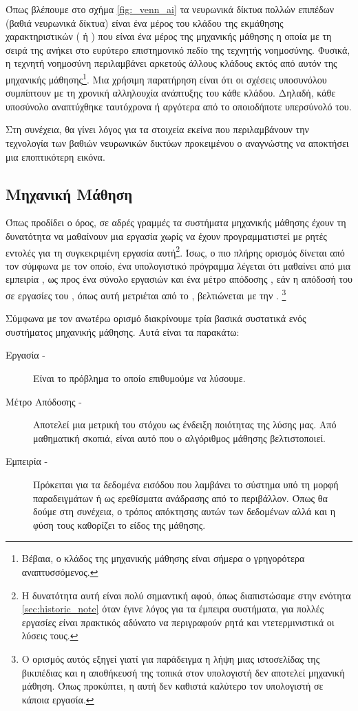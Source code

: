 Όπως βλέπουμε στο σχήμα \ref{fig:_venn_ai} τα νευρωνικά δίκτυα πολλών επιπέδων (βαθιά νευρωνικά δίκτυα) είναι ένα μέρος του κλάδου της εκμάθησης χαρακτηριστικών ( ή ) που είναι ένα μέρος της μηχανικής μάθησης η οποία με τη σειρά της ανήκει στο ευρύτερο επιστημονικό πεδίο της τεχνητής νοημοσύνης. Φυσικά, η τεχνητή νοημοσύνη περιλαμβάνει αρκετούς άλλους κλάδους εκτός από αυτόν της μηχανικής μάθησης\footnote{Βέβαια, ο κλάδος της μηχανικής μάθησης είναι σήμερα ο γρηγορότερα αναπτυσσόμενος.}. Μια χρήσιμη παρατήρηση είναι ότι οι σχέσεις υποσυνόλου συμπίπτουν με τη χρονική αλληλουχία ανάπτυξης του κάθε κλάδου. Δηλαδή, κάθε υποσύνολο αναπτύχθηκε ταυτόχρονα ή αργότερα από το οποιοδήποτε υπερσύνολό του.
\par
Στη συνέχεια, θα γίνει λόγος για τα στοιχεία εκείνα που περιλαμβάνουν την τεχνολογία των βαθιών νευρωνικών δικτύων προκειμένου ο αναγνώστης να αποκτήσει μια εποπτικότερη εικόνα.

\subsection{Μηχανική Μάθηση}


Όπως προδίδει ο όρος, σε αδρές γραμμές τα συστήματα μηχανικής μάθησης έχουν τη δυνατότητα να μαθαίνουν μια εργασία χωρίς να έχουν προγραμματιστεί με ρητές εντολές για τη συγκεκριμένη εργασία αυτή\footnote{Η δυνατότητα αυτή είναι πολύ σημαντική αφού, όπως διαπιστώσαμε στην ενότητα \ref{sec:historic_note} όταν έγινε λόγος για τα έμπειρα συστήματα, για πολλές εργασίες είναι πρακτικός αδύνατο να περιγραφούν ρητά και ντετερμινιστικά οι λύσεις τους.}. Ίσως, ο πιο πλήρης ορισμός δίνεται από τον  \cite{mitchell1997machine} σύμφωνα με τον οποίο, ένα υπολογιστικό πρόγραμμα λέγεται ότι μαθαίνει από μια εμπειρία , ως προς ένα σύνολο εργασιών  και ένα μέτρο απόδοσης , εάν η απόδοσή του σε εργασίες του , όπως αυτή μετριέται από το , βελτιώνεται με την . \footnote{Ο ορισμός αυτός εξηγεί γιατί για παράδειγμα η λήψη μιας ιστοσελίδας της βικιπέδιας και η αποθήκευσή της τοπικά στον υπολογιστή δεν αποτελεί μηχανική μάθηση. Όπως προκύπτει, η  αυτή δεν καθιστά καλύτερο τον υπολογιστή σε κάποια εργασία\cite{geron2019hands}.}
\par

Σύμφωνα με τον ανωτέρω ορισμό διακρίνουμε τρία βασικά συστατικά ενός συστήματος μηχανικής μάθησης. Αυτά είναι τα παρακάτω:
\begin{description}
\item [Εργασία - ] Είναι το πρόβλημα το οποίο επιθυμούμε να λύσουμε.
\item [Μέτρο Απόδοσης - ] Αποτελεί μια μετρική του στόχου ως ένδειξη ποιότητας της λύσης μας. Από μαθηματική σκοπιά, είναι αυτό που ο αλγόριθμος μάθησης βελτιστοποιεί.
\item [Εμπειρία - ] Πρόκειται για τα δεδομένα εισόδου που λαμβάνει το σύστημα υπό τη μορφή παραδειγμάτων ή ως ερεθίσματα ανάδρασης από το περιβάλλον. Όπως θα δούμε στη συνέχεια, ο τρόπος απόκτησης αυτών των δεδομένων αλλά και η φύση τους καθορίζει το είδος της μάθησης.
\end{description}


